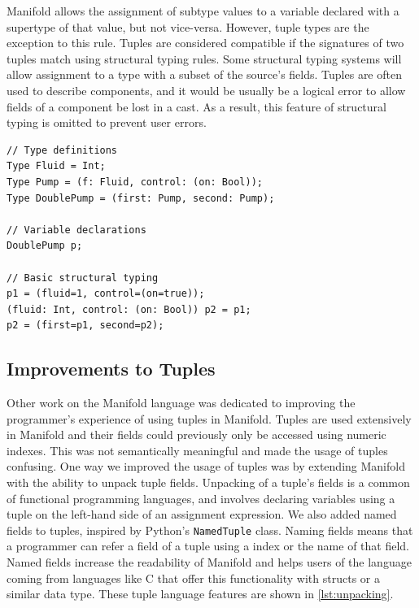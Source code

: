 Manifold allows the assignment of subtype values to a variable declared with a supertype of that value,
but not vice-versa.
However, tuple types are the exception to this rule. Tuples are
considered compatible if the signatures of two tuples
match using structural typing rules.
Some structural typing systems will allow assignment to a type with a subset of the source's fields.
Tuples are often used to describe components, and it would be usually be a logical error to allow
fields of a component be lost in a cast. As a result, this feature of structural typing is omitted to
prevent user errors.

\begin{lstlisting}[label=lst:types,caption=Example of types in a Manifold file]
// Type definitions
Type Fluid = Int;
Type Pump = (f: Fluid, control: (on: Bool));
Type DoublePump = (first: Pump, second: Pump);

// Variable declarations
DoublePump p;

// Basic structural typing
p1 = (fluid=1, control=(on=true));
(fluid: Int, control: (on: Bool)) p2 = p1;
p2 = (first=p1, second=p2);
\end{lstlisting}


\subsection{Improvements to Tuples}

Other work on the Manifold language was dedicated to improving the programmer's experience of using
tuples in Manifold. Tuples are used extensively in Manifold and their
fields could previously only be accessed using numeric indexes. This was not
semantically meaningful and made the usage of tuples confusing. One way we improved the usage of tuples
was by extending
Manifold with the ability to unpack tuple fields. Unpacking of a tuple's
fields is a common of functional programming languages, and involves declaring
variables using a tuple on the left-hand side of an assignment expression. We
also added named fields to tuples, inspired by Python's \texttt{NamedTuple}
class. Naming fields means that a programmer can refer a field of a tuple using a
index or the name of that field. Named fields increase the readability of
Manifold and helps users of the language coming from languages like C that offer this functionality
with structs or a similar data type. These tuple language features are shown in \autoref{lst:unpacking}.

